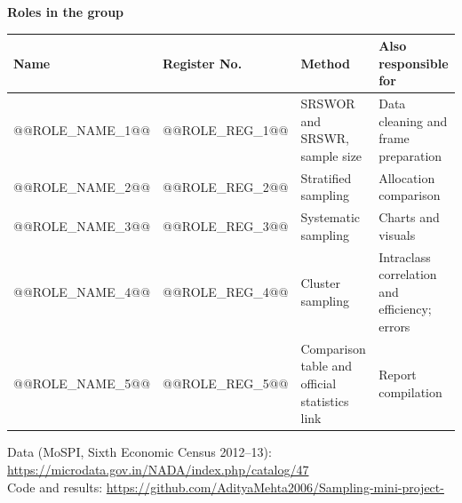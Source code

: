 \documentclass[12pt,a4paper]{article}
\begin{document}
\vspace{1.1cm}
{\fontsize{14}{18}\selectfont \textbf{Roles in the group}\par}
\vspace{0.3cm}
{\fontsize{11}{14}\selectfont
\renewcommand{\arraystretch}{1.35}
\begin{tabular}{|>{\raggedright\arraybackslash}m{3.1cm}|>{\centering\arraybackslash}m{2.0cm}|>{\raggedright\arraybackslash}m{4.5cm}|>{\raggedright\arraybackslash}m{4.3cm}|}
\hline
\textbf{Name} & \textbf{Register No.} & \textbf{Method} & \textbf{Also responsible for} \\ \hline
@@ROLE_NAME_1@@ & @@ROLE_REG_1@@ & SRSWOR and SRSWR, sample size & Data cleaning and frame preparation \\ \hline
@@ROLE_NAME_2@@ & @@ROLE_REG_2@@ & Stratified sampling & Allocation comparison \\ \hline
@@ROLE_NAME_3@@ & @@ROLE_REG_3@@ & Systematic sampling & Charts and visuals \\ \hline
@@ROLE_NAME_4@@ & @@ROLE_REG_4@@ & Cluster sampling & Intraclass correlation and efficiency; errors \\ \hline
@@ROLE_NAME_5@@ & @@ROLE_REG_5@@ & Comparison table and official statistics link & Report compilation \\ \hline
\end{tabular}\par}

\vfill
{\fontsize{9.5}{12}\selectfont
Data (MoSPI, Sixth Economic Census 2012--13): \url{https://microdata.gov.in/NADA/index.php/catalog/47}\\
Code and results: \url{https://github.com/AdityaMehta2006/Sampling-mini-project-}\par}
\end{document}
